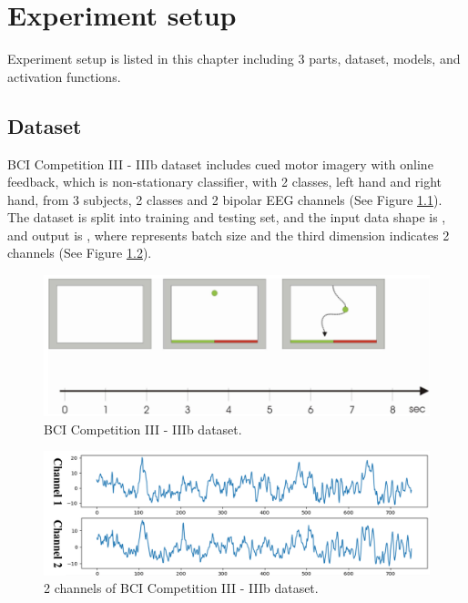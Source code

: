 \chapter{Experiment setup}
\indent
    Experiment setup is listed in this chapter including 3 parts, 
    dataset, models, and activation functions.

\section{Dataset}
\indent
    BCI Competition III - IIIb dataset includes cued motor imagery with online feedback, which is non-stationary classifier,
    with 2 classes, left hand and right hand, from 3 subjects, 2 classes and 2 bipolar EEG channels (See Figure \ref{dataset}).\\
    The dataset is split into training and testing set, and the input data shape is \code{[B, 1, 2, 750]}, and output is \code{[B, 2]}, 
    where  represents batch size and the third dimension indicates 2 channels (See Figure \ref{dataset-channel}).

    \begin{figure}[H]
		\centering
		\includegraphics[scale=0.5]{img/dataset.png}
		\caption{BCI Competition III - IIIb dataset.}
		\label{dataset}
	\end{figure}
    \begin{figure}[H]
		\centering
		\includegraphics[scale=0.5]{img/dataset_channel.png}
		\caption{2 channels of BCI Competition III - IIIb dataset.}
		\label{dataset-channel}
	\end{figure}

